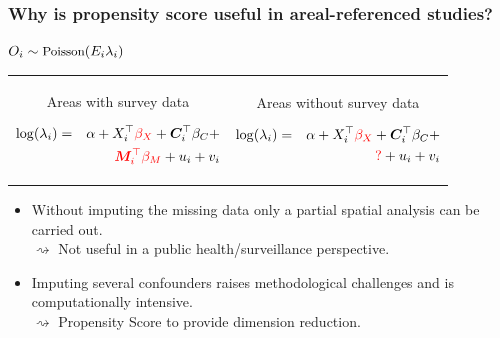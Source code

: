 \documentclass[slidestop,compress,serif,10pt]{beamer}
\begin{document}
\begin{frame}
\frametitle{Why is propensity score useful in areal-referenced studies?}
\centering $\small O_{i}\sim \text{Poisson}(E_{i} \lambda_{i})$
\begin{tabular}{cc}
\begin{minipage}{0.45\linewidth}
Areas with survey data
\begin{footnotesize}\begin{eqnarray*}
\log(\lambda_i) &=& \alpha +  X_i^\top {\color{red}\beta_X} + \boldsymbol{C}_{i}^\top\beta_{C}  + \\
				&&{\color{red} \boldsymbol{M}_{i}^\top \beta_{M}}  + u_{i} + v_{i}
\end{eqnarray*}
\end{footnotesize}
\end{minipage}

&
\hspace{3pt}

\begin{minipage}{0.45\linewidth}
\small Areas without survey data
\begin{footnotesize}\begin{eqnarray*}
\log(\lambda_i) &=& \alpha +  X_i^\top {\color{red}\beta_X} +  \boldsymbol{C}_{i}^\top\beta_{C} + \\
				&&{\color{red}?} + u_{i} + v_{i}
\end{eqnarray*}
\end{footnotesize}
\end{minipage}
\end{tabular}

\begin{itemize}
  \item \vfill Without imputing the missing data only a partial spatial analysis can be carried out.\\
$\rightsquigarrow$ Not useful in a public health/surveillance perspective.
  \item \vfill Imputing several confounders raises methodological challenges and is computationally intensive.\\
$\rightsquigarrow$ {\color{red} Propensity Score} to provide dimension reduction.
\end{itemize}
\end{frame}
\end{document}
